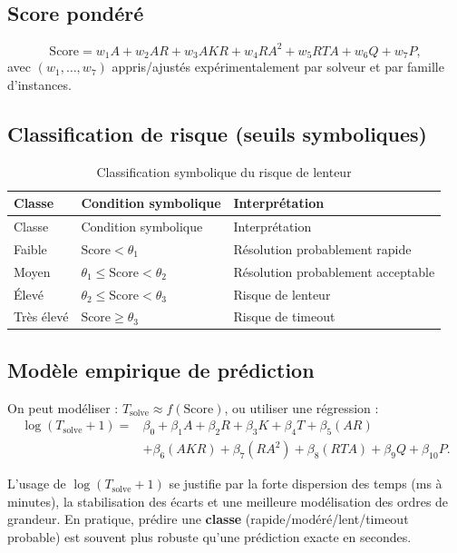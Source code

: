 \documentclass[12pt,a4paper]{article}
\begin{document}
\subsection{Score pondéré}
\begin{equation}
\text{Score} = w_1A + w_2AR + w_3AKR + w_4RA^2 + w_5RTA + w_6Q + w_7P,
\end{equation}
avec $(w_1,\dots,w_7)$ appris/ajustés expérimentalement par solveur et par famille d'instances.

\subsection{Classification de risque (seuils symboliques)}
\begin{longtable}{@{}lll@{}}
\caption{Classification symbolique du risque de lenteur}\label{tab:classification}\\
\toprule
Classe & Condition symbolique & Interprétation \\
\midrule
\endfirsthead
\toprule
Classe & Condition symbolique & Interprétation \\
\midrule
\endhead
Faible & $\text{Score}<\theta_1$ & Résolution probablement rapide \\
Moyen & $\theta_1\le \text{Score}<\theta_2$ & Résolution probablement acceptable \\
Élevé & $\theta_2\le \text{Score}<\theta_3$ & Risque de lenteur \\
Très élevé & $\text{Score}\ge\theta_3$ & Risque de timeout \\
\bottomrule
\end{longtable}

\subsection{Modèle empirique de prédiction}
On peut modéliser : $T_{\text{solve}}\approx f(\text{Score})$, ou utiliser une régression :
\begin{align}
\log(T_{\text{solve}}+1) ={}& \beta_0 + \beta_1A + \beta_2R + \beta_3K + \beta_4T + \beta_5(AR) \nonumber\\
&+ \beta_6(AKR) + \beta_7(RA^2) + \beta_8(RTA) + \beta_9Q + \beta_{10}P.
\end{align}

L'usage de $\log(T_{\text{solve}}+1)$ se justifie par la forte dispersion des temps (ms à minutes), la stabilisation des écarts et une meilleure modélisation des ordres de grandeur. En pratique, prédire une \textbf{classe} (rapide/modéré/lent/timeout probable) est souvent plus robuste qu'une prédiction exacte en secondes.
\end{document}
